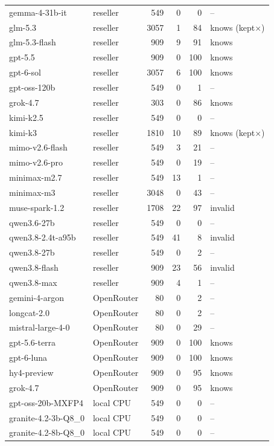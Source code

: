 \begin{tabular}{@{}l l r r r l@{}}
gemma-4-31b-it & reseller & 549 & 0 & 0 & -- \\
glm-5.3 & reseller & 3057 & 1 & 84 & knows (kept$\times$) \\
glm-5.3-flash & reseller & 909 & 9 & 91 & knows \\
gpt-5.5 & reseller & 909 & 0 & 100 & knows \\
gpt-6-sol & reseller & 3057 & 6 & 100 & knows \\
gpt-oss-120b & reseller & 549 & 0 & 1 & -- \\
grok-4.7 & reseller & 303 & 0 & 86 & knows \\
kimi-k2.5 & reseller & 549 & 0 & 0 & -- \\
kimi-k3 & reseller & 1810 & 10 & 89 & knows (kept$\times$) \\
mimo-v2.6-flash & reseller & 549 & 3 & 21 & -- \\
mimo-v2.6-pro & reseller & 549 & 0 & 19 & -- \\
minimax-m2.7 & reseller & 549 & 13 & 1 & -- \\
minimax-m3 & reseller & 3048 & 0 & 43 & -- \\
muse-spark-1.2 & reseller & 1708 & 22 & 97 & invalid \\
qwen3.6-27b & reseller & 549 & 0 & 0 & -- \\
qwen3.8-2.4t-a95b & reseller & 549 & 41 & 8 & invalid \\
qwen3.8-27b & reseller & 549 & 0 & 2 & -- \\
qwen3.8-flash & reseller & 909 & 23 & 56 & invalid \\
qwen3.8-max & reseller & 909 & 4 & 1 & -- \\
gemini-4-argon & OpenRouter & 80 & 0 & 2 & -- \\
longcat-2.0 & OpenRouter & 80 & 0 & 2 & -- \\
mistral-large-4-0 & OpenRouter & 80 & 0 & 29 & -- \\
gpt-5.6-terra & OpenRouter & 909 & 0 & 100 & knows \\
gpt-6-luna & OpenRouter & 909 & 0 & 100 & knows \\
hy4-preview & OpenRouter & 909 & 0 & 95 & knows \\
grok-4.7 & OpenRouter & 909 & 0 & 95 & knows \\
gpt-oss-20b-MXFP4 & local CPU & 549 & 0 & 0 & -- \\
granite-4.2-3b-Q8\_0 & local CPU & 549 & 0 & 0 & -- \\
granite-4.2-8b-Q8\_0 & local CPU & 549 & 0 & 0 & -- \\

\end{tabular}
